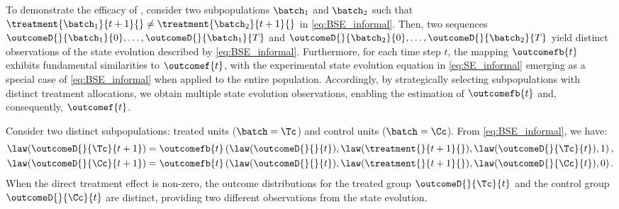To demonstrate the efficacy of \batchingAcronym{}, consider two subpopulations $\batch_1$ and $\batch_2$ such that $\treatment{\batch_1}{t+1}{} \neq \treatment{\batch_2}{t+1}{}$ in \eqref{eq:BSE_informal}. Then, two sequences $\outcomeD{}{\batch_1}{0}, \ldots, \outcomeD{}{\batch_1}{T}$ and $\outcomeD{}{\batch_2}{0}, \ldots, \outcomeD{}{\batch_2}{T}$ yield distinct observations of the state evolution described by \eqref{eq:BSE_informal}. Furthermore, for each time step $t$, the mapping $\outcomefb{t}$ exhibits fundamental similarities to $\outcomef{t}$, with the experimental state evolution equation in \eqref{eq:SE_informal} emerging as a special case of \eqref{eq:BSE_informal} when applied to the entire population. Accordingly, by strategically selecting subpopulations with distinct treatment allocations, we obtain multiple state evolution observations, enabling the estimation of $\outcomefb{t}$ and, consequently, $\outcomef{t}$.
% 
\begin{example}
    \label{exmpl:BernoulliD_subpopulation}
    Consider two distinct subpopulations: treated units ($\batch=\Tc$) and control units ($\batch=\Cc$). From \eqref{eq:BSE_informal}, we have:
    \begin{equation}
    \label{eq:BD_SP_SEs}
        \begin{aligned}
        \law(
        \outcomeD{}{\Tc}{t+1})
        =
        \outcomefb{t}\left(
        \law(
        \outcomeD{}{}{t}
        ),
        \law(
        \treatment{}{t+1}{}
        ),
        \law(
        \outcomeD{}{\Tc}{t}
        ),
        1
        \right),
        \\
        \law(
        \outcomeD{}{\Cc}{t+1})
        =
        \outcomefb{t}\left(
        \law(
        \outcomeD{}{}{t}
        ),
        \law(
        \treatment{}{t+1}{}
        ),
        \law(
        \outcomeD{}{\Cc}{t}
        ),
        0
        \right).
        \end{aligned}
    \end{equation}
    When the direct treatment effect is non-zero, the outcome distributions for the treated group $\outcomeD{}{\Tc}{t}$ and the control group $\outcomeD{}{\Cc}{t}$ are distinct, providing two different observations from the state evolution.
\end{example}
%


